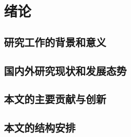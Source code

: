 \chapter{绪论}

\section{研究工作的背景和意义}

\section{国内外研究现状和发展态势}

\section{本文的主要贡献与创新}

\section{本文的结构安排}
